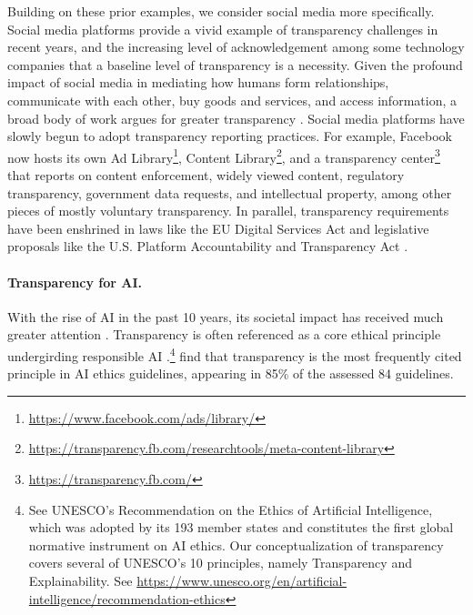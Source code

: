 \documentclass[screen, authorversion, acmsmall]{acmart}
\begin{document}
Building on these prior examples, we consider social media more specifically.
Social media platforms provide a vivid example of transparency challenges in recent years, and the increasing level of acknowledgement among some technology companies that a baseline level of transparency is a necessity. 
Given the profound impact of social media in mediating how humans form relationships, communicate with each other, buy goods and services, and access information, a broad body of work argues for greater transparency \citep[see][]{keller2022platform}. 
Social media platforms have slowly begun to adopt transparency reporting practices.
For example, Facebook now hosts its own Ad Library\footnote{\url{https://www.facebook.com/ads/library/}}, Content Library\footnote{\url{https://transparency.fb.com/researchtools/meta-content-library}}, and a transparency center\footnote{\url{https://transparency.fb.com/}} that reports on content enforcement, widely viewed content, regulatory transparency, government data requests, and intellectual property, among other pieces of mostly voluntary transparency.
In parallel, transparency requirements have been enshrined in laws like the EU Digital Services Act \citep{dsa2022} and legislative proposals like the U.S. Platform Accountability and Transparency Act \citep{pata2021}. 

\paragraph{Transparency for AI.}
With the rise of AI in the past 10 years, its societal impact has received much greater attention \citep{barocas2016, abebe2020roles, hutchinson2021towards, bender2021dangers}.
Transparency is often referenced as a core ethical principle undergirding responsible AI \citep{fjeld2020principled, Hagendorff2020}.\footnote{See UNESCO's Recommendation on the Ethics of Artificial Intelligence, which was adopted by its 193 member states and constitutes the first global normative instrument on AI ethics. Our conceptualization of transparency covers several of UNESCO's 10 principles, namely Transparency and Explainability. See \url{https://www.unesco.org/en/artificial-intelligence/recommendation-ethics}} 
\citet{jobin2019global} find that transparency is the most frequently cited principle in AI ethics guidelines, appearing in 85\% of the assessed 84 guidelines. 
\end{document}
